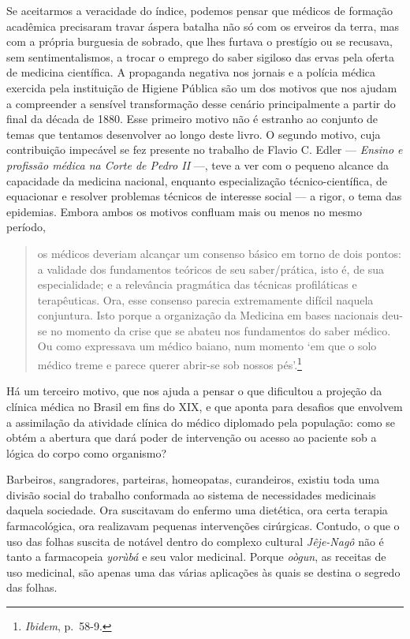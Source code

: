 Se aceitarmos a veracidade do índice, podemos pensar que médicos de
formação acadêmica precisaram travar áspera batalha não só com os
erveiros da terra, mas com a própria burguesia de sobrado, que lhes
furtava o prestígio ou se recusava, sem sentimentalismos, a trocar o
emprego do saber sigiloso das ervas pela oferta de medicina científica.
A propaganda negativa nos jornais e a polícia médica exercida pela
instituição de Higiene Pública são um dos motivos que nos ajudam a
compreender a sensível transformação desse cenário principalmente a
partir do final da década de 1880. Esse primeiro motivo não é estranho
ao conjunto de temas que tentamos desenvolver ao longo deste livro. O
segundo motivo, cuja contribuição impecável se fez presente no trabalho
de Flavio C. Edler --- \textit{Ensino e profissão médica na Corte de Pedro
II} ---, teve a ver com o pequeno alcance da capacidade da medicina
nacional, enquanto especialização técnico-científica, de equacionar e
resolver problemas técnicos de interesse social --- a rigor, o tema das
epidemias. Embora ambos os motivos confluam mais ou menos no mesmo
período,

\begin{quote}
os médicos deveriam alcançar um consenso básico em torno de dois pontos:
a validade dos fundamentos teóricos de seu saber/prática, isto é, de sua
especialidade; e a relevância pragmática das técnicas profiláticas e
terapêuticas. Ora, esse consenso parecia extremamente difícil naquela
conjuntura. Isto porque a organização da Medicina em bases nacionais
deu-se no momento da crise que se abateu nos fundamentos do saber
médico. Ou como expressava um médico baiano, num momento `em que o solo
médico treme e parece querer abrir-se sob nossos pés'.\footnote{\textit{Ibidem},
  p.~58-9.}
\end{quote}

Há um terceiro motivo, que nos ajuda a pensar o que dificultou a
projeção da clínica médica no Brasil em fins do XIX, e que aponta para
desafios que envolvem a assimilação da atividade clínica do médico
diplomado pela população: como se obtém a abertura que dará poder de
intervenção ou acesso ao paciente sob a lógica do corpo como organismo?

Barbeiros, sangradores, parteiras, homeopatas, curandeiros, existiu toda
uma divisão social do trabalho conformada ao sistema de necessidades
medicinais daquela sociedade. Ora suscitavam do enfermo uma dietética,
ora certa terapia farmacológica, ora realizavam pequenas intervenções
cirúrgicas. Contudo, o que o uso das folhas suscita de notável dentro do
complexo cultural \textit{Jêje-Nagô} não é tanto a farmacopeia
\textit{yorùbá} e seu valor medicinal. Porque \textit{oògun}, as receitas de
uso medicinal, são apenas uma das várias aplicações às quais se destina
o segredo das folhas.

